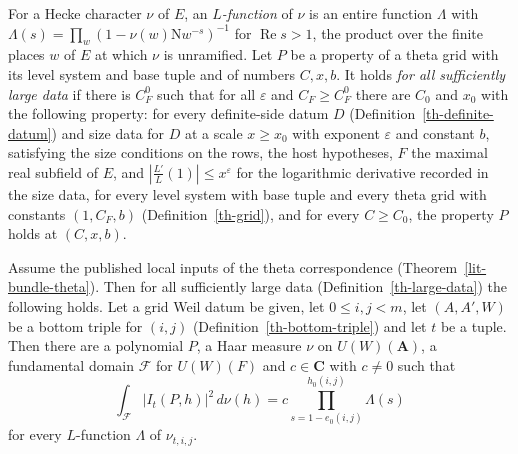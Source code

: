 \begin{definition}\label{th-large-data}
For a Hecke character $\nu$ of $E$, an \emph{$L$-function} of $\nu$ is an
entire function $\Lambda$ with
$\Lambda(s)=\prod_{w}(1-\nu(w)\mathrm Nw^{-s})^{-1}$ for $\operatorname{Re}s>1$,
the product over the finite places $w$ of $E$ at which $\nu$ is unramified. Let
$P$ be a property of a theta grid with its level system and base tuple and of
numbers $C,x,b$. It holds \emph{for all sufficiently large data} if there is
$C_F^0$ such that for all $\varepsilon$ and $C_F\geq C_F^0$ there are $C_0$
and $x_0$ with the following property: for every definite-side datum $D$
(Definition~\ref{th-definite-datum}) and size data for $D$ at a scale
$x\geq x_0$ with exponent $\varepsilon$ and constant $b$, satisfying the size conditions on the
rows, the host hypotheses, $F$ the maximal real subfield of $E$, and
$|\tfrac{L'}{L}(1)|\leq x^\varepsilon$ for the logarithmic derivative recorded
in the size data, for every level system with base tuple and every theta
grid with constants $(1,C_F,b)$ (Definition~\ref{th-grid}), and for every
$C\geq C_0$, the property $P$ holds at $(C,x,b)$.
\end{definition}

\begin{theorem}\label{th-rallis-inner-product}
Assume the published local inputs of the theta correspondence
(Theorem~\ref{lit-bundle-theta}). Then for all sufficiently large data
(Definition~\ref{th-large-data}) the following holds. Let a grid Weil datum be
given, let $0\leq i,j<m$, let $(A,A',W)$ be a bottom triple for $(i,j)$
(Definition~\ref{th-bottom-triple}) and let $t$ be a tuple. Then there are a
polynomial $P$, a Haar measure $\nu$ on $U(W)(\mathbf A)$, a fundamental
domain $\mathcal F$ for $U(W)(F)$ and $c\in\mathbf C$ with $c\neq0$ such that
\[
\int_{\mathcal F}|I_t(P,h)|^2\,d\nu(h)=c\prod_{s=1-e_0(i,j)}^{h_0(i,j)}\Lambda(s)
\]
for every $L$-function $\Lambda$ of $\nu_{t,i,j}$.
\end{theorem}

